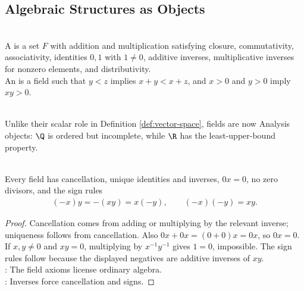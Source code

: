 \subsection{Algebraic Structures as Objects}

\begin{definition} \label{def:field-and-ordered-field-analysis} \\
A  is a set $F$ with addition and multiplication satisfying closure, commutativity, associativity, identities $0,1$ with $1\neq0$, additive inverses, multiplicative inverses for nonzero elements, and distributivity.\\
An  is a field such that $y<z$ implies $x+y<x+z$, and $x>0$ and $y>0$ imply $xy>0$.
\end{definition}

\begin{remark} \label{rem:fields-as-analysis-objects-and-linear-scalars} \\
Unlike their scalar role in Definition \ref{def:vector-space}, fields are now Analysis objects: $\Q$ is ordered but incomplete, while $\R$ has the least-upper-bound property.
\end{remark}

\begin{proposition} \label{prop:field-axiom-consequences-analysis} \\
Every field has cancellation, unique identities and inverses, $0x=0$, no zero divisors, and the sign rules
\begin{align}
(-x)y=-(xy)=x(-y),\qquad (-x)(-y)=xy. \nonumber
\end{align}
\begin{proof}
Cancellation comes from adding or multiplying by the relevant inverse; uniqueness follows from cancellation. Also $0x+0x=(0+0)x=0x$, so $0x=0$. If $x,y\neq0$ and $xy=0$, multiplying by $x^{-1}y^{-1}$ gives $1=0$, impossible. The sign rules follow because the displayed negatives are additive inverses of $xy$.\\
: The field axioms license ordinary algebra.\\
: Inverses force cancellation and signs.
\end{proof}
\end{proposition}

